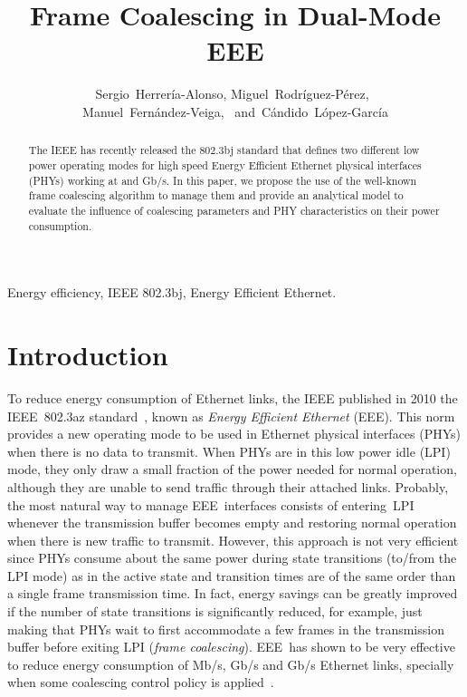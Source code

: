 \documentclass[journal,10pt,letterpaper]{IEEEtran}
\begin{document}
\title{Frame Coalescing in Dual-Mode EEE}

\author{Sergio~Herrería-Alonso, 
  Miguel~Rodríguez-Pérez,~ \\
  Manuel~Fernández-Veiga,~ 
  and~Cándido~López-García}



\maketitle

\begin{abstract}
  The IEEE has recently released the 802.3bj standard that defines two
  different low power operating modes for high speed Energy Efficient
  Ethernet physical interfaces (PHYs) working at  and
  Gb/s. In this paper, we propose the use of the well-known
  frame coalescing algorithm to manage them and provide an analytical
  model to evaluate the influence of coalescing parameters and PHY
  characteristics on their power consumption.
\end{abstract}

\begin{IEEEkeywords}
  Energy efficiency, IEEE 802.3bj, Energy Efficient Ethernet.
\end{IEEEkeywords}

\section{Introduction}
\label{sec:intro}

To reduce energy consumption of Ethernet links, the IEEE published in
2010 the IEEE~802.3az standard~\cite{802.3az}, known as \emph{Energy
  Efficient Ethernet} (EEE). This norm provides a new operating mode
to be used in Ethernet physical interfaces (PHYs) when there is no
data to transmit. When PHYs are in this low power idle (LPI) mode,
they only draw a small fraction of the power needed for normal
operation, although they are unable to send traffic through their
attached links. Probably, the most natural way to manage
EEE~interfaces consists of entering~LPI whenever the transmission
buffer becomes empty and restoring normal operation when there is new
traffic to transmit. However, this approach is not very efficient
since PHYs consume about the same power during state transitions
(to/from the LPI mode) as in the active state and transition times are
of the same order than a single frame transmission time. In fact,
energy savings can be greatly improved if the number of state
transitions is significantly reduced, for example, just making that
PHYs wait to first accommodate a few frames in the transmission buffer
before exiting LPI (\emph{frame coalescing}). EEE~has shown to be very
effective to reduce energy consumption of Mb/s, Gb/s and
Gb/s Ethernet links, specially when some coalescing control
policy is
applied~\cite{christensen10:_the_road_to_eee,herreria12:gig1}.
\end{document}

